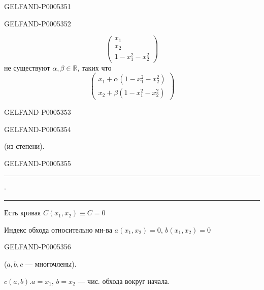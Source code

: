 \begin{GelfandAdjacentEvidence}{GELFAND-P000535}{1}
\end{GelfandAdjacentEvidence}
\begin{GelfandAdjacentEvidence}{GELFAND-P000535}{2}

\[
\begin{pmatrix}x_1\\x_2\\1-x_1^2-x_2^2\end{pmatrix}
\]
не существуют $\alpha,\beta\in\mathbb R$, таких что
\[
\begin{pmatrix}
x_1+\alpha(1-x_1^2-x_2^2)\\
x_2+\beta(1-x_1^2-x_2^2)
\end{pmatrix}
\]
\end{GelfandAdjacentEvidence}
\begin{GelfandAdjacentEvidence}{GELFAND-P000535}{3}

\end{GelfandAdjacentEvidence}
\begin{GelfandAdjacentEvidence}{GELFAND-P000535}{4}

(из степени).
\end{GelfandAdjacentEvidence}
\begin{GelfandAdjacentEvidence}{GELFAND-P000535}{5}


\hfill\rule{.8cm}{.35pt}\enspace\(\cdot\)\enspace\rule{1.5cm}{.35pt}\par

Есть кривая $C(x_1,x_2)\equiv C=0$

Индекс обхода относительно мн-ва $a(x_1,x_2)=0$, $b(x_1,x_2)=0$
\end{GelfandAdjacentEvidence}
\begin{GelfandAdjacentEvidence}{GELFAND-P000535}{6}

($a,b,c$ — многочлены).

$c(a,b)$.\qquad $a=x_1$, $b=x_2$ — чис. обхода вокруг начала.
\end{GelfandAdjacentEvidence}
